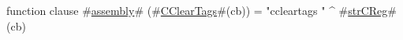 function clause #\hyperref[sailMIPSzassembly]{assembly}# (#\hyperref[sailMIPSzCClearTags]{CClearTags}#(cb)) = "ccleartags " ^ #\hyperref[sailMIPSzstrCReg]{strCReg}#(cb)
